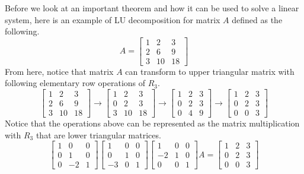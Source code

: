 \documentclass[../main.tex]{subfiles}
\begin{document}
Before we look at an important theorem and how it can be used to
solve a linear system, here is an example of LU decomposition
for matrix $A$ defined as the following.
\[
A =
\begin{bmatrix}
    1 & 2  & 3 \\
    2 & 6  & 9 \\
    3 & 10 & 18
\end{bmatrix}
\]
From here, notice that matrix $A$ can transform to upper triangular
matrix with following elementary row operations of $R_3$.
\[
\begin{bmatrix}
    1 & 2  & 3 \\
    2 & 6  & 9 \\
    3 & 10 & 18
\end{bmatrix}
\rightarrow
\begin{bmatrix}
    1 & 2  & 3 \\
    0 & 2  & 3 \\
    3 & 10 & 18
\end{bmatrix}
\rightarrow
\begin{bmatrix}
    1 & 2 & 3 \\
    0 & 2 & 3 \\
    0 & 4 & 9
\end{bmatrix}
\rightarrow
\begin{bmatrix}
    1 & 2 & 3 \\
    0 & 2 & 3 \\
    0 & 0 & 3
\end{bmatrix}
\]
Notice that the operations above can be represented as the
matrix multiplication with $R_3$ that are lower triangular matrices.
\[
\begin{bmatrix}
    1 & 0  & 0 \\
    0 & 1  & 0 \\
    0 & -2 & 1
\end{bmatrix}
\begin{bmatrix}
    1  & 0 & 0 \\
    0  & 1 & 0 \\
    -3 & 0 & 1
\end{bmatrix}
\begin{bmatrix}
    1  & 0 & 0 \\
    -2 & 1 & 0 \\
    0  & 0 & 1
\end{bmatrix}
A
=
\begin{bmatrix}
    1 & 2 & 3 \\
    0 & 2 & 3 \\
    0 & 0 & 3
\end{bmatrix}
\]
\end{document}
